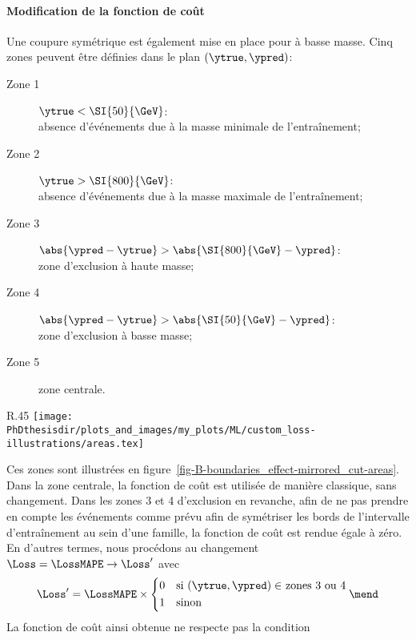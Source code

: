 \paragraph{Modification de la fonction de coût}
Une coupure symétrique est également mise en place pour à basse masse.
Cinq zones peuvent être définies dans le plan $(\ytrue, \ypred)$:
\begin{description}
\item[Zone 1] $\ytrue < \SI{50}{\GeV}$:\\
absence d'événements due à la masse minimale de l'entraînement;
\item[Zone 2] $\ytrue > \SI{800}{\GeV}$:\\
absence d'événements due à la masse maximale de l'entraînement;
\item[Zone 3] $\abs{\ypred - \ytrue} > \abs{\SI{800}{\GeV} - \ypred}$:\\
zone d'exclusion à haute masse;
\item[Zone 4] $\abs{\ypred - \ytrue} > \abs{\SI{50}{\GeV} - \ypred}$:\\
zone d'exclusion à basse masse;
\item[Zone 5] zone centrale.
\end{description}
\begin{wrapfigure}{R}{.45\textwidth}
\centering
\texttt{[image: \\PhDthesisdir/plots\_and\_images/my\_plots/ML/custom\_loss-illustrations/areas.tex]}
\caption{Zones considérées pour l'entraînement.}
\label{fig-B-boundaries_effect-mirrored_cut-areas}
\end{wrapfigure}
\par\noindent
Ces zones sont illustrées en figure~\ref{fig-B-boundaries_effect-mirrored_cut-areas}.
Dans la zone centrale, la fonction de coût est utilisée de manière classique, sans changement.
Dans les zones 3 et 4 d'exclusion en revanche,
afin de ne pas prendre en compte les événements comme prévu afin de symétriser les bords de l'intervalle d'entraînement au sein d'une famille,
la fonction de coût est rendue égale à zéro.
En d'autres termes, nous procédons au changement
$\Loss=\LossMAPE\to\Loss'$ avec
\begin{equation}
\Loss' = \LossMAPE \times
\left\lbrace
\begin{aligned}
0 \quad & \text{si $(\ytrue, \ypred)\in$ zones 3 ou 4}\\
1 \quad & \text{sinon}
\end{aligned}
\right.
\mend
\end{equation}
La fonction de coût ainsi obtenue ne respecte pas la condition
